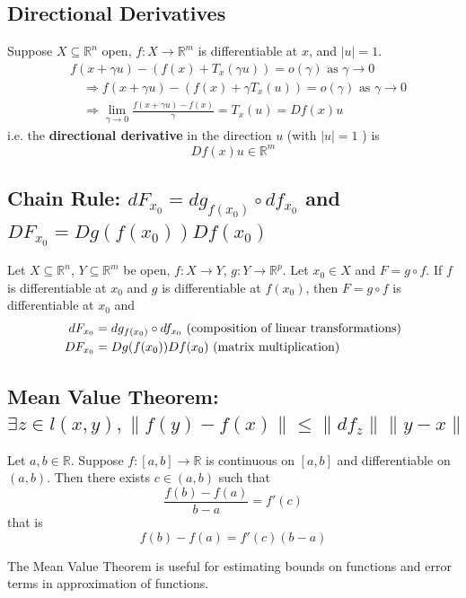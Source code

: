 \documentclass[11pt]{elegantbook}
\begin{document}
\subsection{Directional Derivatives}
Suppose $X \subseteq \mathbb{R}^n$ open, $f: X \rightarrow \mathbb{R}^m$ is differentiable at $x$, and $|u|=1$.
$$
\begin{aligned}
& f(x+\gamma u)-\left(f(x)+T_x(\gamma u)\right)=o(\gamma) \text { as } \gamma \rightarrow 0 \\
& \quad \Rightarrow f(x+\gamma u)-\left(f(x)+\gamma T_x(u)\right)=o(\gamma) \text { as } \gamma \rightarrow 0 \\
& \quad \Rightarrow \lim _{\gamma \rightarrow 0} \frac{f(x+\gamma u)-f(x)}{\gamma}=T_x(u)=Df(x) u
\end{aligned}
$$
i.e. the \textbf{directional derivative} in the direction $u$ (with $|u|=1$ ) is
$$
Df(x) u \in \mathbb{R}^m
$$


\subsection{Chain Rule: $d F_{x_0}= d g_{f(x_0)} \circ d f_{x_0}$ and $D F_{x_0}= D g (f(x_0)) D f (x_0)$}
\begin{theorem}
    Let $X \subseteq \mathbb{R}^n$, $Y \subseteq \mathbb{R}^m$ be open, $f : X \rightarrow Y$, $g : Y \rightarrow \mathbb{R}^p$. Let $x_0\in X$ and $F = g \circ f$. If $f$ is differentiable at $x_0$ and $g$ is differentiable at $f(x_0)$, then $F = g \circ f$ is differentiable at $x_0$ and
    \begin{equation}
        \begin{aligned}
            d F_{x_0}&= d g_{f(x_0)} \circ d f_{x_0} \textnormal{ (composition of linear transformations)}\\
            D F_{x_0}&= D g (f(x_0)) D f (x_0) \textnormal{ (matrix multiplication)}\\
        \end{aligned}
        \nonumber
    \end{equation}
\end{theorem}

\subsection{Mean Value Theorem: $\exists z\in l(x,y),\|f(y)-f(x)\|\leq \|df_z\| \|y-x\|$}
\begin{theorem}
    Let $a, b \in \mathbb{R}$. Suppose $f : [a, b] \rightarrow \mathbb{R}$ is continuous on $[a, b]$ and differentiable on $(a, b)$. Then there exists $c \in (a, b)$ such that $$\frac{f(b)-f(a)}{b-a}=f'(c)$$
    that is $$f(b)-f(a)=f'(c)(b-a)$$
\end{theorem}
\begin{note}
    The Mean Value Theorem is useful for estimating bounds on functions and error terms in approximation of functions.
\end{note}
\end{document}
